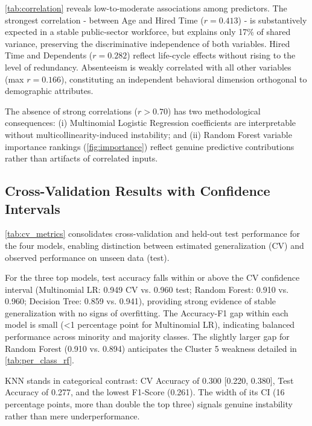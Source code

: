 \documentclass[alpha-refs,english]{RBCA_v3.0}
\begin{document}
\cref{tab:correlation} reveals low-to-moderate associations among predictors. 
The strongest correlation - between Age and Hired Time ($r = 0.413$) - is 
substantively expected in a stable public-sector workforce, but explains only 
17\% of shared variance, preserving the discriminative independence of both 
variables. Hired Time and Dependents ($r = 0.282$) reflect life-cycle effects 
without rising to the level of redundancy. Absenteeism is weakly correlated 
with all other variables (max $r = 0.166$), constituting an independent 
behavioral dimension orthogonal to demographic attributes.

The absence of strong correlations ($r > 0.70$) has two methodological 
consequences: (i) Multinomial Logistic Regression coefficients are interpretable 
without multicollinearity-induced instability; and (ii) Random Forest variable 
importance rankings (\cref{fig:importance}) reflect genuine predictive 
contributions rather than artifacts of correlated inputs.

\subsection{Cross-Validation Results with Confidence Intervals}

\cref{tab:cv_metrics} consolidates cross-validation and held-out test 
performance for the four models, enabling distinction between estimated 
generalization (CV) and observed performance on unseen data (test).

For the three top models, test accuracy falls within or above the CV 
confidence interval (Multinomial LR: 0.949 CV vs. 0.960 test; Random Forest: 
0.910 vs. 0.960; Decision Tree: 0.859 vs. 0.941), providing strong evidence 
of stable generalization with no signs of overfitting. The Accuracy-F1 gap 
within each model is small (<1 percentage point for Multinomial LR), 
indicating balanced performance across minority and majority classes. The 
slightly larger gap for Random Forest (0.910 vs. 0.894) anticipates the 
Cluster 5 weakness detailed in \cref{tab:per_class_rf}.

KNN stands in categorical contrast: CV Accuracy of 0.300 [0.220, 0.380], 
Test Accuracy of 0.277, and the lowest F1-Score (0.261). The width of its 
CI (16 percentage points, more than double the top three) signals genuine 
instability rather than mere underperformance.
\end{document}
